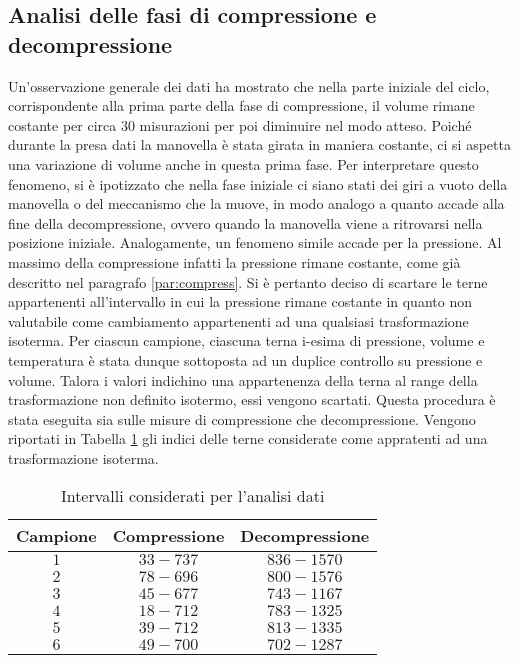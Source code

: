 \documentclass[a4paper,11pt,oneside]{article}
\begin{document}
\subsection{Analisi delle fasi di compressione e decompressione}
Un'osservazione generale dei dati ha mostrato che nella parte iniziale del ciclo, corrispondente alla prima parte della fase di compressione, il volume rimane costante per circa 30 misurazioni per poi diminuire nel modo atteso. Poiché durante la presa dati la manovella è stata girata in maniera costante, ci si aspetta una variazione di volume anche in questa prima fase. Per interpretare questo fenomeno, si è ipotizzato che nella fase iniziale ci siano stati dei giri a vuoto della manovella o del meccanismo che la muove, in modo analogo a quanto accade alla fine della decompressione, ovvero quando la manovella viene a ritrovarsi nella posizione iniziale.
Analogamente, un fenomeno simile accade per la pressione. Al massimo della compressione infatti la pressione rimane costante, come già descritto nel paragrafo \ref{par:compress}. Si è pertanto deciso di scartare le terne appartenenti all'intervallo in cui la pressione rimane costante in quanto non valutabile come cambiamento appartenenti ad una qualsiasi trasformazione isoterma.
Per ciascun campione, ciascuna terna i-esima di pressione, volume e temperatura è stata dunque sottoposta ad un duplice controllo su pressione e volume. Talora i valori indichino una appartenenza della terna al range della trasformazione non definito isotermo, essi vengono scartati. Questa procedura è stata eseguita sia sulle misure di compressione che decompressione. Vengono riportati in Tabella \ref{tab:misure_scartate} gli indici delle terne considerate come appratenti ad una trasformazione isoterma. 
 
\begin{table}[h!]
    \centering
    \begin{tabular}{|c|c|c|}
        \hline
        \textbf{Campione} & \textbf{Compressione} & \textbf{Decompressione} \\ \hline
        \rowcolor[rgb]{0.85,0.85,0.85}$1$ & $33-737$ & $836-1570$ \\ \hline
        $2$ & $78-696$ & $800-1576$ \\ \hline
        \rowcolor[rgb]{0.85,0.85,0.85}$3$ & $45-677$ & $743-1167$ \\ \hline
        $4$ & $18-712$ & $783-1325$ \\ \hline
        \rowcolor[rgb]{0.85,0.85,0.85}$5$ & $39-712$ & $813-1335$ \\ \hline
        $6$ & $49-700$ & $702-1287$ \\ \hline
    \end{tabular}
    \caption{Intervalli considerati per l'analisi dati}
    \label{tab:misure_scartate}
\end{table}
\end{document}
